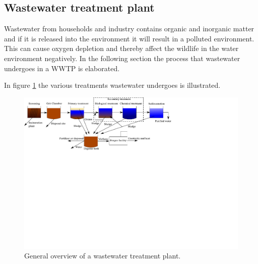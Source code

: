 
\subsection{Wastewater treatment plant}\label{subse:Wastewater treatment plant}
Wastewater from households and industry contains organic and inorganic matter and if it is released into the environment it will result in a polluted environment. This can cause oxygen depletion and thereby affect the wildlife in the water environment negatively. %
In the following section the process that wastewater undergoes in a WWTP is elaborated. 

In figure \ref{fig:wwtp_process} the various treatments wastewater undergoes is illustrated. 
\begin{figure}[H]
\centering
\includegraphics[clip, trim=0cm 13cm 9cm 0cm, width=1.00\textwidth]{report/introduction/pictures/WWTP_overview}
\caption{General overview of a wastewater treatment plant.}
\label{fig:wwtp_process}
\end{figure}


